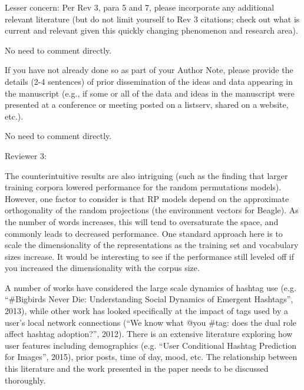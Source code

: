 \documentclass[answers,12pt]{exam}
\begin{document}
\begin{questions}
\question Lesser concern: Per Rev 3, para 5 and 7, please incorporate any additional relevant literature (but do not limit yourself to Rev 3 citations; check out what is current and relevant given this quickly changing phenomenon and research area).

\begin{solution}
No need to comment directly.
\end{solution}

\question If you have not already done so as part of your Author Note, please provide the details (2-4 sentences) of prior dissemination of the ideas and data appearing in the manuscript (e.g., if some or all of the data and ideas in the manuscript were presented at a conference or meeting posted on a listserv, shared on a website, etc.).

\begin{solution}
No need to comment directly.
\end{solution}

Reviewer 3: 

\question The counterintuitive results are also intriguing (such as the finding that larger training corpora lowered performance for the random permutations models). However, one factor to consider is that RP models depend on the approximate orthogonality of the random projections (the environment vectors for Beagle). As the number of words increases, this will tend to oversaturate the space, and commonly leads to decreased performance. One standard approach here is to scale the dimensionality of the representations as the training set and vocabulary sizes increase. It would be interesting to see if the performance still leveled off if you increased the dimensionality with the corpus size.

\begin{solution}
\end{solution}

\question A number of works have considered the large scale dynamics of hashtag use (e.g. ``\#Bigbirds Never Die: Understanding Social Dynamics of Emergent Hashtags'', 2013), while other work has looked specifically at the impact of tags used by a user's local network connections (``We know what @you \#tag: does the dual role affect hashtag adoption?'', 2012). There is an extensive literature exploring how user features including demographics (e.g. ``User Conditional Hashtag Prediction for Images'', 2015), prior posts, time of day, mood, etc. The relationship between this literature and the work presented in the paper needs to be discussed thoroughly.


\end{questions}
\end{document}
